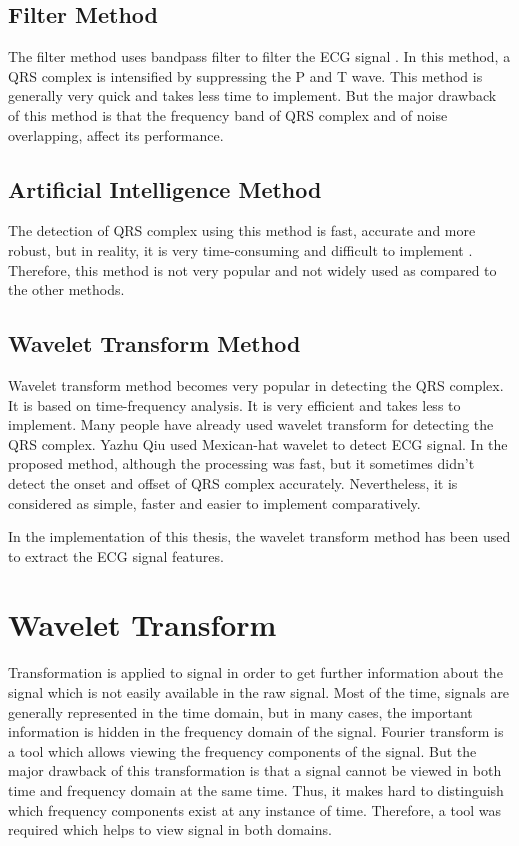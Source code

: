 \subsection{Filter Method}
The filter method uses bandpass filter to filter the ECG signal \cite{4122029}\cite{554762}. In this method, a QRS complex is intensified by suppressing the P and T wave. This method is generally very quick and takes less time to implement. But the major drawback of this method is that the frequency band of QRS complex and of noise overlapping, affect its performance.

\subsection{Artificial Intelligence Method}
The detection of QRS complex using this method is fast, accurate and more robust, but in reality, it is very time-consuming and difficult to implement \cite{126604}\cite{PIETKA1991139}\cite{58593}. Therefore, this method is not very popular and not widely used as compared to the other methods.

\subsection{Wavelet Transform Method}
Wavelet transform method becomes very popular in detecting the QRS complex. It is based on time-frequency analysis. It is very efficient and takes less to implement. Many people have already used wavelet transform for detecting the QRS complex. Yazhu Qiu \cite{PMID:17228741} used Mexican-hat wavelet to detect ECG signal. In the proposed method, although the processing was fast, but it sometimes didn't detect the onset and offset of QRS complex accurately. Nevertheless, it is considered as simple, faster and easier to implement comparatively.


In the implementation of this thesis, the wavelet transform method has been used to extract the ECG signal features.

\section{Wavelet Transform}
Transformation is applied to signal in order to get further information about the signal which is not easily available in the raw signal. Most of the time, signals are generally represented in the time domain, but in many cases, the important information is hidden in the frequency domain of the signal. Fourier transform is a tool which allows viewing the frequency components of the signal. But the major drawback of this transformation is that a signal cannot be viewed in both time and frequency domain at the same time. Thus, it makes hard to distinguish which frequency components exist at any instance of time. Therefore, a tool was required which helps to view signal in both domains.

